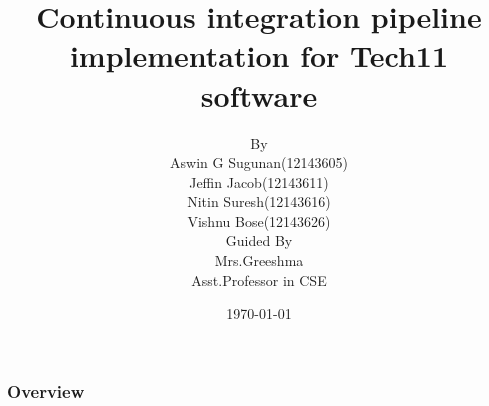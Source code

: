 \documentclass{beamer}
\title[] { Continuous integration pipeline implementation for Tech11 software
}
\author[]{By\\ Aswin G Sugunan(12143605)\\Jeffin Jacob(12143611)\\Nitin Suresh(12143616)\\Vishnu Bose(12143626)\\Guided By\\Mrs.Greeshma\\Asst.Professor in CSE}
\institute[CE CHERTHALA]{COLLEGE OF ENGINEERING CHERTHALA}
\date{\today}
\begin{document}
\begin{frame}
\titlepage %
\end{frame}

\begin{frame}
\frametitle{Overview} %
\tableofcontents %
\end{frame}




%
 

 
\end{document}
